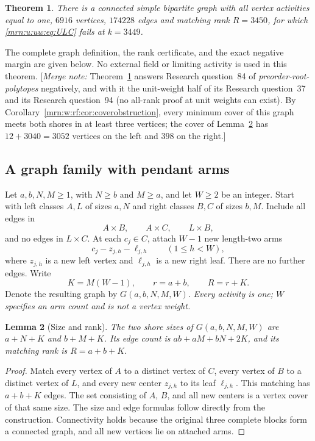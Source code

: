 \documentclass[11pt,a4paper]{article}
\newtheorem{theorem}{Theorem}[section]
\newtheorem{lemma}[theorem]{Lemma}
\theoremstyle{remark}\newtheorem{remark}[theorem]{Remark}
\newcommand{\mnote}[1]{[\textit{Merge note:} #1]}
\newcommand{\prp}{\emph{preorder-root-polytopes}}
\begin{document}
\begin{theorem}\label{mrn:u:uw:thm:main}
There is a connected simple bipartite graph with all vertex activities equal to one, $6916$ vertices, $174228$ edges and matching rank $R=3450$, for which \eqref{mrn:u:uw:eq:ULC} fails at $k=3449$.
\end{theorem}
The complete graph definition, the rank certificate, and the exact negative margin are given below. No external field or limiting activity is used in this theorem.
\mnote{Theorem~\ref{mrn:u:uw:thm:main} answers Research question~84 of \prp{} negatively, and with it the unit-weight half of its Research question~37 and its Research question~94 (no all-rank proof at unit weights can exist). By Corollary~\ref{mrn:w:rf:cor:coverobstruction}, every minimum cover of this graph meets both shores in at least three vertices; the cover of Lemma~\ref{mrn:u:uw:lem:rank} has $12+3040=3052$ vertices on the left and $398$ on the right.}

\subsection{A graph family with pendant arms}
Let $a,b,N,M\ge1$, with $N\ge b$ and $M\ge a$, and let $W\ge2$ be an integer. Start with left classes $A,L$ of sizes $a,N$ and right classes $B,C$ of sizes $b,M$. Include all edges in
\[
 A\times B,\qquad A\times C,\qquad L\times B,
\]
and no edges in $L\times C$. At each $c_j\in C$, attach $W-1$ new length-two arms
\[
 c_j-z_{j,h}-\ell_{j,h}\qquad(1\le h<W),
\]
where $z_{j,h}$ is a new left vertex and $\ell_{j,h}$ is a new right leaf. There are no further edges. Write
\[
 K=M(W-1),\qquad r=a+b,\qquad R=r+K.
\]
Denote the resulting graph by $G(a,b,N,M,W)$.
\emph{Every activity is one; $W$ specifies an arm count and is not a vertex weight.}

\begin{lemma}[Size and rank]\label{mrn:u:uw:lem:rank}
The two shore sizes of $G(a,b,N,M,W)$ are $a+N+K$ and $b+M+K$. Its edge count is $ab+aM+bN+2K$, and its matching rank is $R=a+b+K$.
\end{lemma}
\begin{proof}
Match every vertex of $A$ to a distinct vertex of $C$, every vertex of $B$ to a distinct vertex of $L$, and every new center $z_{j,h}$ to its leaf $\ell_{j,h}$. This matching has $a+b+K$ edges. The set consisting of $A$, $B$, and all new centers is a vertex cover of that same size. The size and edge formulas follow directly from the construction. Connectivity holds because the original three complete blocks form a connected graph, and all new vertices lie on attached arms.
\end{proof}
\end{document}
